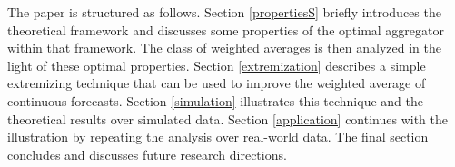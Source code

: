 \documentclass[11pt]{article}
\theoremstyle{definition}
\theoremstyle{definition}
\begin{document}


The paper is structured as follows. Section \ref{propertiesS} briefly introduces the theoretical framework and discusses some properties of the optimal aggregator within that framework. The class of weighted averages is then analyzed in the light of these optimal properties. Section \ref{extremization} describes a simple extremizing technique that can be used to improve the weighted average of continuous forecasts. Section \ref{simulation} illustrates this technique and the theoretical results over simulated data. Section \ref{application} continues with the illustration by repeating the analysis over real-world data. The final section concludes and discusses future research directions.






%
%
\end{document}
